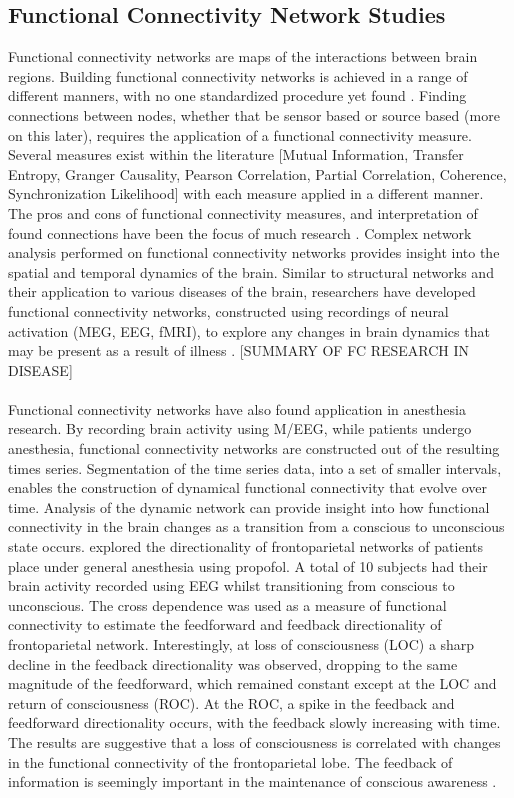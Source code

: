 \documentclass[11pt]{article}
\begin{document}
\subsection{Functional Connectivity Network Studies}
Functional connectivity networks are maps of the interactions between brain regions. Building functional connectivity networks is achieved in a range of different manners, with no one standardized procedure yet found \citep{fornito2013graph}. Finding connections between nodes, whether that be sensor based or source based (more on this later), requires the application of a functional connectivity measure. Several measures exist within the literature [Mutual Information, Transfer Entropy, Granger Causality, Pearson Correlation, Partial Correlation, Coherence, Synchronization Likelihood] with each measure applied in a different manner. The pros and cons of functional connectivity measures, and interpretation of found connections have been the focus of much research \citep{jal1,darvas,wangrev}. Complex network analysis performed on functional connectivity networks provides insight into the spatial and temporal dynamics of the brain. Similar to structural networks and their application to various diseases of the brain, researchers have developed functional connectivity networks, constructed using recordings of neural activation (MEG, EEG, fMRI), to explore any changes in brain dynamics that may be present as a result of illness \citep{stamfc, lynfc}. [SUMMARY OF FC RESEARCH IN DISEASE]\\
\\ 
Functional connectivity networks have also found application in anesthesia research. By recording brain activity using M/EEG, while patients undergo anesthesia, functional connectivity networks are constructed out of the resulting times series. Segmentation of the time series data, into a set of smaller intervals, enables the construction of dynamical functional connectivity that evolve over time. Analysis of the dynamic network can provide insight into how functional connectivity in the brain changes as a transition from a conscious to unconscious state occurs. \citet{leeold} explored the directionality of frontoparietal networks of patients place under general anesthesia using propofol. A total of 10 subjects had their brain activity recorded using EEG whilst transitioning from conscious to unconscious. The cross dependence was used as a measure of functional connectivity to estimate the feedforward and feedback directionality of frontoparietal network. Interestingly, at loss of consciousness (LOC) a sharp decline in the feedback directionality was observed, dropping to the same magnitude of the feedforward, which remained constant except at the LOC and return of consciousness (ROC). At the ROC, a spike in the feedback and feedforward directionality occurs, with the feedback slowly increasing with time. The results are suggestive that a loss of consciousness is correlated with changes in the functional connectivity of the frontoparietal lobe. The feedback of information is seemingly important in the maintenance of conscious awareness \citep{leeold}.\\
\end{document}

